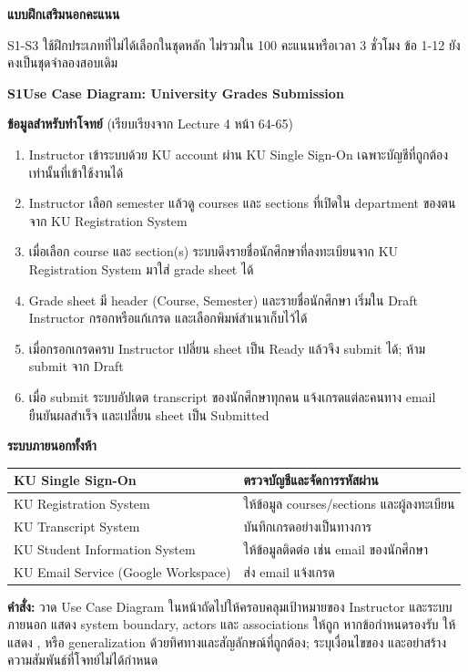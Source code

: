 \newpage
\textbf{\Large แบบฝึกเสริมนอกคะแนน}\par
S1-S3 ใช้ฝึกประเภทที่ไม่ได้เลือกในชุดหลัก ไม่รวมใน 100 คะแนนหรือเวลา 3 ชั่วโมง ข้อ 1-12 ยังคงเป็นชุดจำลองสอบเดิม\par
\medskip
\textbf{S1\quad Use Case Diagram: University Grades Submission}\par
\textbf{ข้อมูลสำหรับทำโจทย์} (เรียบเรียงจาก Lecture 4 หน้า 64-65)\par
\begin{enumerate}[itemsep=3pt]
\item Instructor เข้าระบบด้วย KU account ผ่าน KU Single Sign-On เฉพาะบัญชีที่ถูกต้องเท่านั้นที่เข้าใช้งานได้
\item Instructor เลือก semester แล้วดู courses และ sections ที่เปิดใน department ของตนจาก KU Registration System
\item เมื่อเลือก course และ section(s) ระบบดึงรายชื่อนักศึกษาที่ลงทะเบียนจาก KU Registration System มาใส่ grade sheet ได้
\item Grade sheet มี header (Course, Semester) และรายชื่อนักศึกษา เริ่มใน Draft Instructor กรอกหรือแก้เกรด และเลือกพิมพ์สำเนาเก็บไว้ได้
\item เมื่อกรอกเกรดครบ Instructor เปลี่ยน sheet เป็น Ready แล้วจึง submit ได้; ห้าม submit จาก Draft
\item เมื่อ submit ระบบอัปเดต transcript ของนักศึกษาทุกคน แจ้งเกรดแต่ละคนทาง email ยืนยันผลสำเร็จ และเปลี่ยน sheet เป็น Submitted
\end{enumerate}
\textbf{ระบบภายนอกทั้งห้า}\par
\begin{tabularx}{\linewidth}{|>{\raggedright\arraybackslash}m{5.3cm}|Y|}\hline
KU Single Sign-On & ตรวจบัญชีและจัดการรหัสผ่าน\\\hline
KU Registration System & ให้ข้อมูล courses/sections และผู้ลงทะเบียน\\\hline
KU Transcript System & บันทึกเกรดอย่างเป็นทางการ\\\hline
KU Student Information System & ให้ข้อมูลติดต่อ เช่น email ของนักศึกษา\\\hline
KU Email Service (Google Workspace) & ส่ง email แจ้งเกรด\\\hline
\end{tabularx}
\par\medskip
\textbf{คำสั่ง:} วาด Use Case Diagram ในหน้าถัดไปให้ครอบคลุมเป้าหมายของ Instructor และระบบภายนอก แสดง system boundary, actors และ associations ให้ถูก หากข้อกำหนดรองรับ ให้แสดง ,  หรือ generalization ด้วยทิศทางและสัญลักษณ์ที่ถูกต้อง; ระบุเงื่อนไขของ  และอย่าสร้างความสัมพันธ์ที่โจทย์ไม่ได้กำหนด\par
